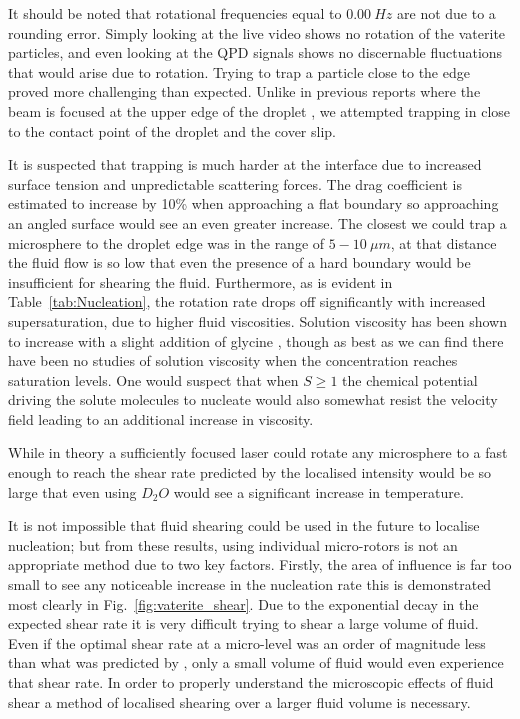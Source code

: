 It should be noted that rotational frequencies equal to 
$0.00\ Hz$ are not due to a rounding error. Simply looking
at the live video shows no rotation of the vaterite particles,
and even looking at the QPD signals shows no discernable 
fluctuations that would arise due to rotation. Trying to trap 
a particle close to the edge proved more challenging than 
expected. Unlike in previous reports where the beam is 
focused at the upper edge of the droplet \cite{Liao2022, 
Yuyama2010, Sugiyama2022}, we attempted trapping in close 
to the contact point of the droplet and the cover slip. 

It is suspected that trapping is much harder at the 
interface due to increased surface tension and unpredictable 
scattering forces. The drag coefficient is estimated to increase
by 10\% when approaching a flat boundary \cite{Yao2009} so approaching 
an angled surface would see an even greater increase.  The 
closest we could trap a microsphere to the droplet edge was 
in the range of $5-10\ \mu m$, at that distance the fluid flow 
is so low that even the presence of a hard boundary would be 
insufficient for shearing the fluid. Furthermore, as is evident 
in Table~\ref{tab:Nucleation}, the rotation rate drops off 
significantly with increased supersaturation, due to higher 
fluid viscosities. Solution viscosity has been shown to increase 
with a slight addition of glycine \cite{Patyar2020}, though as 
best as we can find there have been no studies of solution 
viscosity when the concentration reaches saturation levels. 
One would suspect that when $S\geq1$ the chemical potential 
driving the solute molecules to nucleate would also somewhat 
resist the velocity field leading to an additional increase in 
viscosity.

While in theory a sufficiently focused laser could rotate any 
microsphere to a fast enough to reach the shear rate predicted 
by \cite{Debuysschere2023} the localised intensity would be so 
large that even using $D_2O$ would see a significant increase 
in temperature. 

It is not impossible that fluid shearing could be used in the 
future to localise nucleation; but from these results, using 
individual micro-rotors is not an appropriate method due to
two key factors. Firstly, the area of influence is far too 
small to see any noticeable increase in the nucleation rate 
this is demonstrated most clearly in Fig.~\ref{fig:vaterite_shear}. 
Due to the exponential decay in the expected shear rate it is 
very difficult trying to shear a large volume of fluid. Even 
if the optimal shear rate at a micro-level was an order of 
magnitude less than what was predicted by \cite{Debuysschere2023}, 
only a small volume of fluid would even experience that shear 
rate. In order to properly understand the microscopic effects 
of fluid shear a method of localised shearing over a larger 
fluid volume is necessary.  

